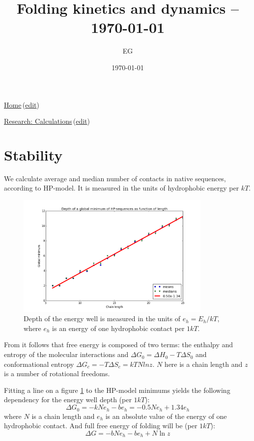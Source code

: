 \documentclass[12pt]{paper}
\title{Folding kinetics and dynamics -- \today}
\author{EG}
\date{\today}
\newcommand{\gD}{\Delta}
\newcommand{\wikilink}[2] { \href{#1.pdf}{#2}\,(\href{#1.tex}{edit})}
\begin{document}
 \maketitle
\wikilink{home}{Home}

\wikilink{research\_calculations}{Research: Calculations}

\section{Stability}\label{sec:stability}
We  calculate average and median number of contacts in native sequences, according to 
HP-model. It is measured in the units of hydrophobic energy per $kT$.
\begin{figure}[h!]
  \centering
  \includegraphics[width=0.85\textwidth]{pictures/hp-depth-length.png} 
  \caption{Depth of the energy well is measured in the units of $e_h=E_h/kT$, where $e_h$ is an 
energy of one hydrophobic contact per $1kT$.}
  \label{fig:hp-depth-length}
\end{figure}
From \cite{Ghosh2009} it follows that free energy is composed of two terms: the enthalpy and 
entropy of the molecular interactions and $\gD G_0=\gD H_0-T\gD S_0$ and conformational entropy 
$\gD G_c=-T\gD S_c=kTN ln z$. $N$ here is a chain length and $z$ is a number of rotational 
freedoms.

Fitting a line on a figure \ref{fig:hp-depth-length} to the HP-model minimums yields the following 
dependency for the energy well depth (per $1kT$):
\begin{equation}
\gD G_0= -kNe_h-be_h= -0.5Ne_h +1.34e_h
\end{equation} 
where $N$ is a chain length and $e_h$ is an absolute value of the energy 
of one hydrophobic contact.
And full free energy of folding will be (per $1kT$):
\begin{equation}
 \gD G = -bNe_h -be_h+N\ln z
\end{equation} 
\end{document}
